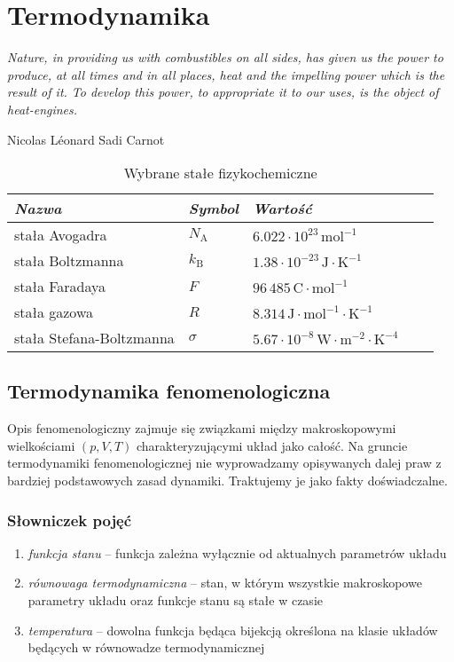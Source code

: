 \documentclass[../main.tex]{subfiles}
\begin{document}
\section{Termodynamika}
\textit{Nature, in providing us with combustibles on all sides, has given us the power to produce,
at all times and in all places, heat and the impelling power which is the result of it. To develop
this power, to appropriate it to our uses, is the object of heat-engines.}\begin{flushright}Nicolas
Léonard Sadi Carnot\end{flushright}

\begin{table}[h]
    \centering
    \begin{tabular}{ *5l }    \toprule \emph{Nazwa} & \emph{Symbol} & \emph{Wartość}  \\\midrule
    stała Avogadra    & \(N_\text{A}\)  & \(6.022\cdot 10^{23}\,\text{mol}^{-1}\)    \\ 
    stała Boltzmanna  & \(k_\text{B}\) & \(1.38\cdot 10^{-23}\,\text{J}\cdot\text{K}^{-1}\)  \\ 
    stała Faradaya  & \(F\) & \(96\,485\,\text{C}\cdot\text{mol}^{-1}\)  \\
    stała gazowa     & \(R\)  & \(8.314\,\text{J}\cdot\text{mol}^{-1}\cdot\text{K}^{-1}\)   \\ 
    stała Stefana-Boltzmanna  & \(\sigma\) & \(5.67\cdot
    10^{-8}\,\text{W}\cdot\text{m}^{-2}\cdot\text{K}^{-4}\)\\ 
    
    \bottomrule
    \hline
\end{tabular}
\caption{Wybrane stałe fizykochemiczne}
\end{table}

\subsection{Termodynamika fenomenologiczna}
Opis fenomenologiczny zajmuje się związkami między makroskopowymi wielkościami \((p,V,T)\)
charakteryzującymi układ jako całość. Na gruncie termodynamiki fenomenologicznej nie wyprowadzamy
opisywanych dalej praw z bardziej podstawowych zasad dynamiki. Traktujemy je jako fakty
doświadczalne.
\subsubsection*{Słowniczek pojęć}
\begin{enumerate}
    \item \textit{funkcja stanu} -- funkcja zależna wyłącznie od aktualnych parametrów układu
    \item \textit{równowaga termodynamiczna} -- stan, w którym wszystkie makroskopowe parametry
    układu oraz funkcje stanu są stałe w czasie
    \item \textit{temperatura} -- dowolna funkcja będąca bijekcją określona na klasie układów
    będących w równowadze termodynamicznej
\end{enumerate}
\end{document}
